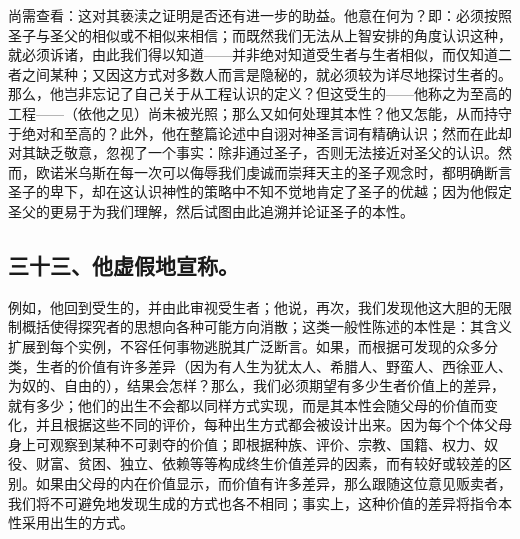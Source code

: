 尚需查看：这对其亵渎之证明是否还有进一步的助益。他意在何为？即：必须按照圣子与圣父的相似或不相似来相信；而既然我们无法从上智安排的角度认识这种，就必须诉诸，由此我们得以知道——并非绝对知道受生者与生者相似，而仅知道二者之间某种；又因这方式对多数人而言是隐秘的，就必须较为详尽地探讨生者的。那么，他岂非忘记了自己关于从工程认识的定义？但这受生的——他称之为至高的工程——（依他之见）尚未被光照；那么又如何处理其本性？他又怎能，从而持守于绝对和至高的？此外，他在整篇论述中自诩对神圣言词有精确认识；然而在此却对其缺乏敬意，忽视了一个事实：除非通过圣子，否则无法接近对圣父的认识。然而，欧诺米乌斯在每一次可以侮辱我们虔诚而崇拜天主的圣子观念时，都明确断言圣子的卑下，却在这认识神性的策略中不知不觉地肯定了圣子的优越；因为他假定圣父的更易于为我们理解，然后试图由此追溯并论证圣子的本性。\par


\subsection{三十三、他虚假地宣称。}

例如，他回到受生的，并由此审视受生者；他说，再次，我们发现他这大胆的无限制概括使得探究者的思想向各种可能方向消散；这类一般性陈述的本性是：其含义扩展到每个实例，不容任何事物逃脱其广泛断言。如果，而根据可发现的众多分类，生者的价值有许多差异（因为有人生为犹太人、希腊人、野蛮人、西徐亚人、为奴的、自由的），结果会怎样？那么，我们必须期望有多少生者价值上的差异，就有多少；他们的出生不会都以同样方式实现，而是其本性会随父母的价值而变化，并且根据这些不同的评价，每种出生方式都会被设计出来。因为每个个体父母身上可观察到某种不可剥夺的价值；即根据种族、评价、宗教、国籍、权力、奴役、财富、贫困、独立、依赖等等构成终生价值差异的因素，而有较好或较差的区别。如果由父母的内在价值显示，而价值有许多差异，那么跟随这位意见贩卖者，我们将不可避免地发现生成的方式也各不相同；事实上，这种价值的差异将指令本性采用出生的方式。\par

